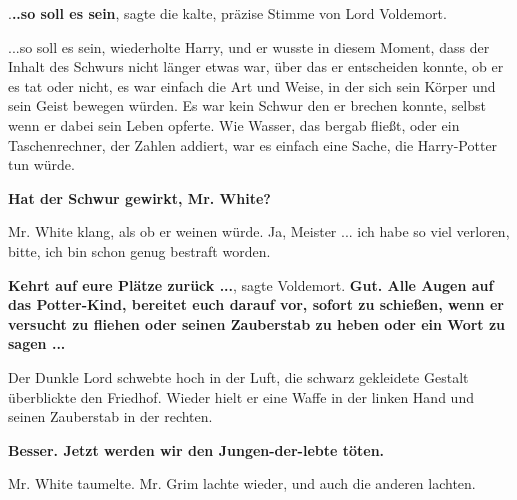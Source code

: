 \glqq{}.\textbf{..so soll es sein}\grqq{}, sagte die kalte, präzise Stimme von
Lord Voldemort.

\glqq{}...so soll es sein\grqq{}, wiederholte Harry, und er wusste in diesem
Moment, dass der Inhalt des Schwurs nicht länger etwas war, über das er
entscheiden konnte, ob er es tat oder nicht, es war einfach die Art und Weise,
in der sich sein Körper und sein Geist bewegen würden. Es war kein Schwur den er
brechen konnte, selbst wenn er dabei sein Leben opferte. Wie Wasser, das bergab
fließt, oder ein Taschenrechner, der Zahlen addiert, war es einfach eine Sache,
die Harry-Potter tun würde.

\glqq{}\textbf{Hat der Schwur gewirkt, Mr. White?}\grqq{}

Mr. White klang, als ob er weinen würde. \glqq{}Ja, Meister ... ich habe so viel
verloren, bitte, ich bin schon genug bestraft worden.\grqq{}

\glqq{}\textbf{Kehrt auf eure Plätze zurück ...}\grqq{}, sagte Voldemort. \glqq{}
\textbf{Gut. Alle Augen auf das Potter-Kind, bereitet euch darauf vor, sofort zu
schießen, wenn er versucht zu fliehen oder seinen Zauberstab zu heben oder ein
Wort zu sagen ...}\grqq{}

Der Dunkle Lord schwebte hoch in der Luft, die schwarz gekleidete Gestalt
überblickte den Friedhof. Wieder hielt er eine Waffe in der linken Hand und
seinen Zauberstab in der rechten.

\glqq{}\textbf{Besser. Jetzt werden wir den Jungen-der-lebte töten.}\grqq{}

Mr. White taumelte. Mr. Grim lachte wieder, und auch die anderen lachten.

